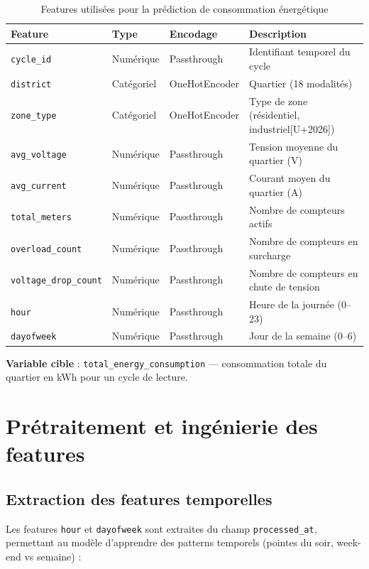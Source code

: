\documentclass[1pt,a4paper]{report}
\begin{document}
\begin{table}[H]
\centering
\caption{Features utilis\'{e}es pour la pr\'{e}diction de consommation \'{e}nerg\'{e}tique}
\label{tab:ml_features}
\renewcommand{\arraystretch}{1.3}
\begin{tabularx}{\textwidth}{|l|l|l|X|}
\hline
\rowcolor{primaryblue!20}
\textbf{Feature} & \textbf{Type} & \textbf{Encodage} & \textbf{Description} \\
\hline
\texttt{cycle\_id} & Num\'{e}rique & Passthrough & Identifiant temporel du cycle \\
\texttt{district} & Cat\'{e}goriel & OneHotEncoder & Quartier (18 modalit\'{e}s) \\
\texttt{zone\_type} & Cat\'{e}goriel & OneHotEncoder & Type de zone (r\'{e}sidentiel, industriel[U+2026]) \\
\texttt{avg\_voltage} & Num\'{e}rique & Passthrough & Tension moyenne du quartier (V) \\
\texttt{avg\_current} & Num\'{e}rique & Passthrough & Courant moyen du quartier (A) \\
\texttt{total\_meters} & Num\'{e}rique & Passthrough & Nombre de compteurs actifs \\
\texttt{overload\_count} & Num\'{e}rique & Passthrough & Nombre de compteurs en surcharge \\
\texttt{voltage\_drop\_count} & Num\'{e}rique & Passthrough & Nombre de compteurs en chute de tension \\
\texttt{hour} & Num\'{e}rique & Passthrough & Heure de la journ\'{e}e (0--23) \\
\texttt{dayofweek} & Num\'{e}rique & Passthrough & Jour de la semaine (0--6) \\
\hline
\end{tabularx}
\end{table}

\textbf{Variable cible} : \texttt{total\_energy\_consumption} --- consommation totale du quartier en kWh pour un cycle de lecture.

\section{Pr\'{e}traitement et ing\'{e}nierie des features}

\subsection{Extraction des features temporelles}

Les features \texttt{hour} et \texttt{dayofweek} sont extraites du champ \texttt{processed\_at}, permettant au mod\`{e}le d'apprendre des patterns temporels (pointes du soir, week-end vs semaine) :
\end{document}

